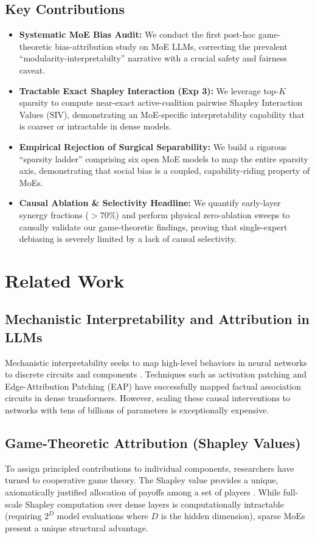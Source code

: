 \documentclass[11pt,a4paper]{article}
\begin{document}
\subsection{Key Contributions}
\begin{itemize}
    \item \textbf{Systematic MoE Bias Audit:} We conduct the first post-hoc game-theoretic bias-attribution study on MoE LLMs, correcting the prevalent ``modularity-interpretabilty'' narrative with a crucial safety and fairness caveat.
    \item \textbf{Tractable Exact Shapley Interaction (Exp 3):} We leverage top-$K$ sparsity to compute near-exact active-coalition pairwise Shapley Interaction Values (SIV), demonstrating an MoE-specific interpretability capability that is coarser or intractable in dense models.
    \item \textbf{Empirical Rejection of Surgical Separability:} We build a rigorous ``sparsity ladder'' comprising six open MoE models to map the entire sparsity axis, demonstrating that social bias is a coupled, capability-riding property of MoEs.
    \item \textbf{Causal Ablation \& Selectivity Headline:} We quantify early-layer synergy fractions ($>70\%$) and perform physical zero-ablation sweeps to causally validate our game-theoretic findings, proving that single-expert debiasing is severely limited by a lack of causal selectivity.
\end{itemize}

\section{Related Work}
\subsection{Mechanistic Interpretability and Attribution in LLMs}
Mechanistic interpretability seeks to map high-level behaviors in neural networks to discrete circuits and components \cite{dissecting_bias}. Techniques such as activation patching and Edge-Attribution Patching (EAP) have successfully mapped factual association circuits in dense transformers. However, scaling these causal interventions to networks with tens of billions of parameters is exceptionally expensive. 

\subsection{Game-Theoretic Attribution (Shapley Values)}
To assign principled contributions to individual components, researchers have turned to cooperative game theory. The Shapley value provides a unique, axiomatically justified allocation of payoffs among a set of players \cite{realexp}. While full-scale Shapley computation over dense layers is computationally intractable (requiring $2^D$ model evaluations where $D$ is the hidden dimension), sparse MoEs present a unique structural advantage. 
\end{document}
